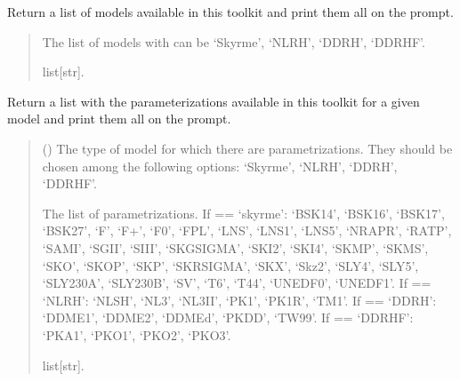 \documentclass[letterpaper,10pt,english]{sphinxmanual}
\begin{document}
\begin{fulllineitems}
\label{\detokenize{source/api/setup_pheno_matter:nucleardatapy.setup_pheno_matter.models_pheno_matter}}
\pysigstartsignatures
{}
\pysigstopsignatures
\sphinxAtStartPar
Return a list of models available in this toolkit and print them all on the prompt.
\begin{quote}\begin{description}
\sphinxAtStartPar
The list of models with can be ‘Skyrme’, ‘NLRH’, ‘DDRH’, ‘DDRHF’.

\sphinxAtStartPar
list{[}str{]}.

\end{description}\end{quote}

\end{fulllineitems}


\begin{fulllineitems}
\label{\detokenize{source/api/setup_pheno_matter:nucleardatapy.setup_pheno_matter.params_pheno_matter}}
\pysigstartsignatures
{}
\pysigstopsignatures
\sphinxAtStartPar
Return a list with the parameterizations available in
this toolkit for a given model and print them all on the prompt.
\begin{quote}\begin{description}
\sphinxAtStartPar
{} () \textendash{} The type of model for which there are parametrizations.     They should be chosen among the following options: ‘Skyrme’, ‘NLRH’,     ‘DDRH’, ‘DDRHF’.

\sphinxAtStartPar
The list of parametrizations.     If  == ‘skyrme’: ‘BSK14’,     ‘BSK16’, ‘BSK17’, ‘BSK27’, ‘F\sphinxhyphen{}’, ‘F+’, ‘F0’, ‘FPL’, ‘LNS’, ‘LNS1’, ‘LNS5’,     ‘NRAPR’, ‘RATP’, ‘SAMI’, ‘SGII’, ‘SIII’, ‘SKGSIGMA’, ‘SKI2’, ‘SKI4’, ‘SKMP’,     ‘SKMS’, ‘SKO’, ‘SKOP’, ‘SKP’, ‘SKRSIGMA’, ‘SKX’, ‘Skz2’, ‘SLY4’, ‘SLY5’,     ‘SLY230A’, ‘SLY230B’, ‘SV’, ‘T6’, ‘T44’, ‘UNEDF0’, ‘UNEDF1’.     If  == ‘NLRH’: ‘NL\sphinxhyphen{}SH’, ‘NL3’, ‘NL3II’, ‘PK1’, ‘PK1R’, ‘TM1’.     If  == ‘DDRH’: ‘DDME1’, ‘DDME2’, ‘DDMEd’, ‘PKDD’, ‘TW99’.     If  == ‘DDRHF’: ‘PKA1’, ‘PKO1’, ‘PKO2’, ‘PKO3’.

\sphinxAtStartPar
list{[}str{]}.

\end{description}\end{quote}

\end{fulllineitems}
\end{document}
